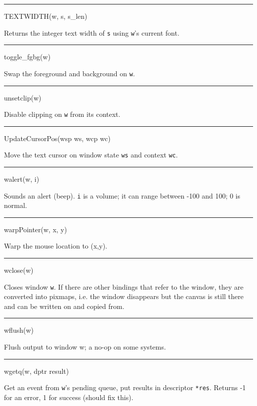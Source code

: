 {\sffamily\bfseries
\bigskip\hrule\vspace{0.1cm}
\noindent
TEXTWIDTH(w, s, s\_len)}


Returns the integer text width of \texttt{s} using \texttt{w}{}'s current font.


{\sffamily\bfseries
\bigskip\hrule\vspace{0.1cm}
\noindent
toggle\_fgbg(w)}


Swap the foreground and background on \texttt{w}.


{\sffamily\bfseries
\bigskip\hrule\vspace{0.1cm}
\noindent
unsetclip(w)}


Disable clipping on \texttt{w} from its context.


{\sffamily\bfseries
\bigskip\hrule\vspace{0.1cm}
\noindent
UpdateCursorPos(wsp ws, wcp wc)}


Move the text cursor on window state \texttt{ws} and context \texttt{wc}.


{\sffamily\bfseries
\bigskip\hrule\vspace{0.1cm}
\noindent
walert(w, i)}


Sounds an alert (beep). \texttt{i} is a volume; it can range between
-100 and 100; 0 is normal.


{\sffamily\bfseries
\bigskip\hrule\vspace{0.1cm}
\noindent
warpPointer(w, x, y)}


Warp the mouse location to (x,y).


{\sffamily\bfseries
\bigskip\hrule\vspace{0.1cm}
\noindent
wclose(w)}


Closes window \texttt{w}. If there are other bindings that refer to
the window, they are converted into pixmaps, i.e.  the window
disappears but the canvas is still there and can be written on and
copied from.


{\sffamily\bfseries
\bigskip\hrule\vspace{0.1cm}
\noindent
wflush(w)}


Flush output to window w; a no-op on some systems.


{\sffamily\bfseries
\bigskip\hrule\vspace{0.1cm}
\noindent
wgetq(w, dptr result)}


Get an event from \texttt{w}{}'s pending queue, put results in
descriptor \texttt{*res}. Returns -1 for an error, 1 for success
(should fix this).


